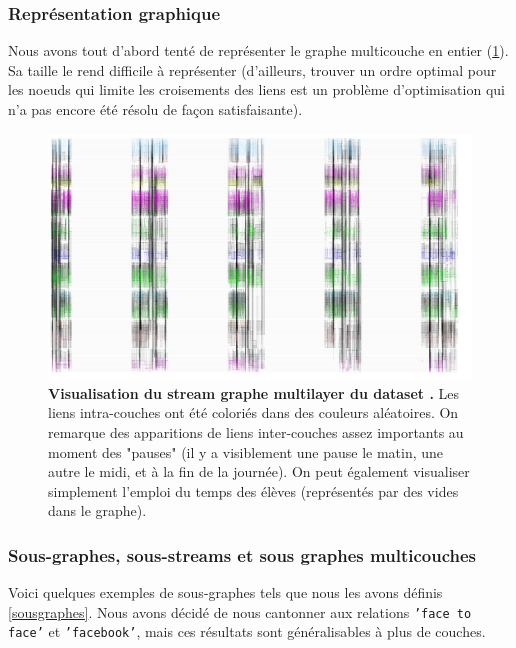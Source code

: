 \documentclass[11pt,a4paper]{article}
\theoremstyle{definition}
\theoremstyle{remark}
\theoremstyle{remark}
\begin{document}
	\subsubsection{Représentation graphique}  
  
  Nous avons tout d'abord tenté de représenter le graphe multicouche en entier (\cref{lyceeentier}). Sa taille le rend difficile à représenter (d'ailleurs, trouver un ordre optimal pour les noeuds qui limite les croisements des liens est un problème d'optimisation qui n'a pas encore été résolu de façon satisfaisante).
	
	\begin{figure}[h]
	\includegraphics[width=\textwidth]{lyceeentier.JPG}
	\caption{\textbf{Visualisation du stream graphe multilayer du dataset \cite{cpge}.} Les liens intra-couches ont été coloriés dans des couleurs aléatoires. On remarque des apparitions de liens inter-couches assez importants au moment des "pauses" (il y a visiblement une pause le matin, une autre le midi, et à la fin de la journée). On peut également visualiser simplement l'emploi du temps des élèves (représentés par des vides dans le graphe).}
	\label{lyceeentier}
\end{figure}





\subsubsection{Sous-graphes, sous-streams et sous graphes multicouches}

Voici quelques exemples de sous-graphes tels que nous les avons définis \cref{sousgraphes}. Nous avons décidé de nous cantonner aux relations \texttt{'face to face'} et \texttt{'facebook'}, mais ces résultats sont généralisables à plus de couches. 
\end{document}
